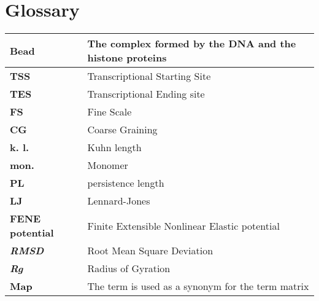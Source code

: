 \section{Glossary} \label{chap: term explanation}

\small{\begin{table}[H]
\begin{tabular}{|l|l|}
\hline
\textbf{Bead} & The complex formed by the DNA and the histone proteins \\
\hline
\textbf{TSS} & Transcriptional Starting Site \\
\hline
\textbf{TES} & Transcriptional Ending site \\
\hline
\textbf{FS} & Fine Scale \\
\hline
\textbf{CG} & Coarse Graining \\
\hline
\textbf{k. l.} & Kuhn length\\
\hline
\textbf{mon.} & Monomer\\
\hline
\textbf{PL} & persistence length\\
\hline
\textbf{LJ} & Lennard-Jones\\
\hline
\textbf{FENE potential} & Finite Extensible Nonlinear Elastic potential\\
\hline
\textbf{\textit{RMSD}} & Root Mean Square Deviation\\
\hline
\textbf{\textit{Rg}} & Radius of Gyration\\
\hline
\textbf{Map} & The term is used as a synonym for the term matrix\\
\hline
\end{tabular}
\end{table}}